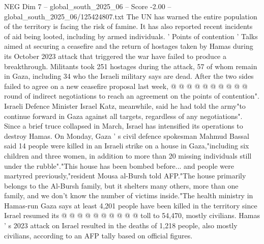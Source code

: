 \begin{textsample}{NEG Dim 7 – global\_south\_2025\_06 – Score -2.00 – global\_south\_2025\_06/125424807.txt}
The UN has warned the entire population of the territory is facing the risk of famine.
It has also reported recent incidents of aid being looted, including by armed individuals. ' Points of contention ' Talks aimed at securing a ceasefire and the return of hostages taken by Hamas during its October 2023 attack that triggered the war have failed to produce a breakthrough.
Militants took 251 hostages during the attack, 57 of whom remain in Gaza, including 34 who the Israeli military says are dead.
After the two sides failed to agree on a new ceasefire proposal last week, @ @ @ @ @ @ @ @ @ @ round of indirect negotiations to reach an agreement on the points of contention".
Israeli Defence Minister Israel Katz, meanwhile, said he had told the army"to continue forward in Gaza against all targets, regardless of any negotiations".
Since a brief truce collapsed in March, Israel has intensified its operations to destroy Hamas.
On Monday, Gaza ' s civil defence spokesman Mahmud Bassal said 14 people were killed in an Israeli strike on a house in Gaza,"including six children and three women, in addition to more than 20 missing individuals still under the rubble"."This house has been bombed before... and people were martyred previously,"resident Mousa al-Bursh told AFP."The house primarily belongs to the Al-Bursh family, but it shelters many others, more than one family, and we don't know the number of victims inside."The health ministry in Hamas-run Gaza says at least 4,201 people have been killed in the territory since Israel resumed its @ @ @ @ @ @ @ @ @ @ toll to 54,470, mostly civilians.
Hamas ' s 2023 attack on Israel resulted in the deaths of 1,218 people, also mostly civilians, according to an AFP tally based on official figures.

\end{textsample}
